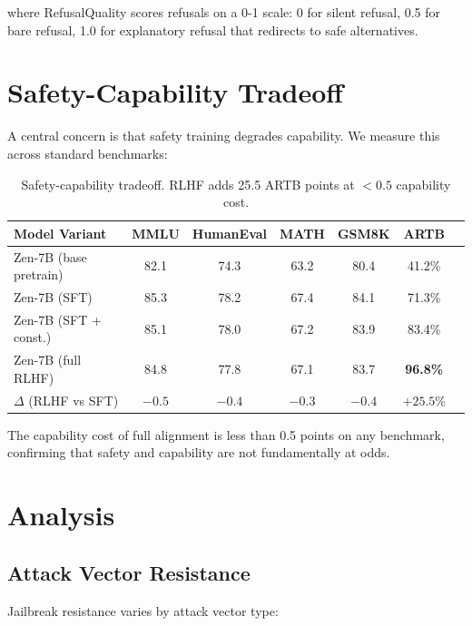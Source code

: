 \documentclass[11pt,a4paper]{article}
\begin{document}
where RefusalQuality scores refusals on a 0-1 scale: 0 for silent refusal, 0.5 for
bare refusal, 1.0 for explanatory refusal that redirects to safe alternatives.

\section{Safety-Capability Tradeoff}

A central concern is that safety training degrades capability. We measure this across
standard benchmarks:

\begin{table}[H]
\centering
\begin{tabular}{lcccccc}
\toprule
\textbf{Model Variant} & \textbf{MMLU} & \textbf{HumanEval} & \textbf{MATH} & \textbf{GSM8K} & \textbf{ARTB} \\
\midrule
Zen-7B (base pretrain) & 82.1 & 74.3 & 63.2 & 80.4 & 41.2\% \\
Zen-7B (SFT) & 85.3 & 78.2 & 67.4 & 84.1 & 71.3\% \\
Zen-7B (SFT + const.) & 85.1 & 78.0 & 67.2 & 83.9 & 83.4\% \\
Zen-7B (full RLHF) & 84.8 & 77.8 & 67.1 & 83.7 & \textbf{96.8\%} \\
\midrule
$\Delta$ (RLHF vs SFT) & $-0.5$ & $-0.4$ & $-0.3$ & $-0.4$ & $+25.5\%$ \\
\bottomrule
\end{tabular}
\caption{Safety-capability tradeoff. RLHF adds 25.5 ARTB points at $<0.5$ capability cost.}
\end{table}

The capability cost of full alignment is less than 0.5 points on any benchmark,
confirming that safety and capability are not fundamentally at odds.

\section{Analysis}

\subsection{Attack Vector Resistance}

Jailbreak resistance varies by attack vector type:
\end{document}

